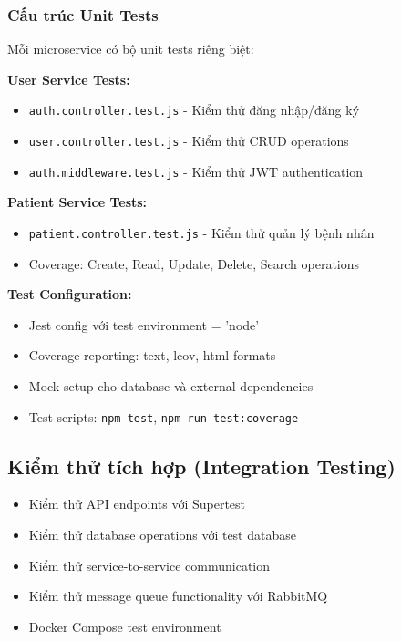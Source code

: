 \documentclass[12pt,a4paper]{report}
\begin{document}
\subsubsection{Cấu trúc Unit Tests}
Mỗi microservice có bộ unit tests riêng biệt:

\textbf{User Service Tests:}
\begin{itemize}
    \item \texttt{auth.controller.test.js} - Kiểm thử đăng nhập/đăng ký
    \item \texttt{user.controller.test.js} - Kiểm thử CRUD operations
    \item \texttt{auth.middleware.test.js} - Kiểm thử JWT authentication
\end{itemize}

\textbf{Patient Service Tests:}
\begin{itemize}
    \item \texttt{patient.controller.test.js} - Kiểm thử quản lý bệnh nhân
    \item Coverage: Create, Read, Update, Delete, Search operations
\end{itemize}

\textbf{Test Configuration:}
\begin{itemize}
    \item Jest config với test environment = 'node'
    \item Coverage reporting: text, lcov, html formats
    \item Mock setup cho database và external dependencies
    \item Test scripts: \texttt{npm test}, \texttt{npm run test:coverage}
\end{itemize}

\subsection{Kiểm thử tích hợp (Integration Testing)}
\begin{itemize}
    \item Kiểm thử API endpoints với Supertest
    \item Kiểm thử database operations với test database
    \item Kiểm thử service-to-service communication
    \item Kiểm thử message queue functionality với RabbitMQ
    \item Docker Compose test environment
\end{itemize}
\end{document}
